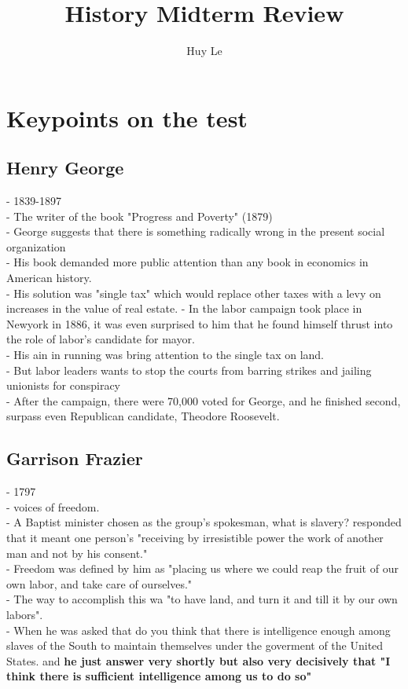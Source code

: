 \documentclass{article}
\begin{document}
\title{ History Midterm Review}
\author{Huy Le}
\maketitle
\section{Keypoints on the test}
\subsection{ Henry George}
- 1839-1897\\
- The writer of the book "Progress and Poverty" (1879)\\
- George suggests that there is something radically wrong in the present social organization\\
- His book demanded more public attention than any book in economics in American history.\\
- His solution was "single tax" which would replace other taxes with a levy on increases in the value of real estate.
- In the labor campaign took place in Newyork in 1886, it was even surprised to him that he found himself thrust into the role of labor's candidate for mayor.\\
- His ain in running was bring attention to the single tax on land.\\
- But labor leaders wants to stop the courts from barring strikes and jailing unionists for conspiracy\\
- After the campaign, there were 70,000 voted for George, and he finished second, surpass even Republican candidate, Theodore Roosevelt.\\
\subsection{ Garrison Frazier}
- 1797\\
- voices of freedom.\\
- A Baptist minister chosen as the group's spokesman, what is slavery? responded that it meant one person's "receiving by irresistible power the work of another man and not by his consent." \\
- Freedom was defined by him as "placing us where we could reap the fruit of our own labor, and take care of ourselves." \\
- The way to accomplish this wa "to have land, and turn it and till it by our own labors".\\
- When he was asked that do you think that there is intelligence enough among slaves of the South to maintain themselves under the goverment of the United States. and \textbf{he just answer very shortly but also very decisively that "I think there is sufficient intelligence among us to do so"}
\end{document}
